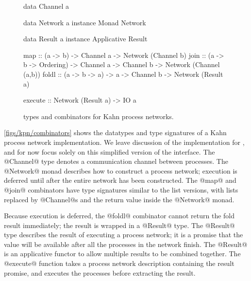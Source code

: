 \begin{figure}
\begin{haskell}
data Channel a

data Network a
instance Monad Network

data Result  a
instance Applicative Result

map     :: (a -> b) -> Channel a
        -> Network (Channel b)
join    :: (a -> b -> Ordering) -> Channel a -> Channel b
        -> Network (Channel (a,b))
foldl   :: (a -> b -> a) -> a -> Channel b
        -> Network (Result a)

execute :: Network (Result a) -> IO a
\end{haskell}
\caption[Types and combinators for Kahn process networks]{types and combinators for Kahn process networks.}
\label{figs/kpn/combinators}
\end{figure}

\autoref{figs/kpn/combinators} shows the datatypes and type signatures of a Kahn process network implementation.
We leave discussion of the implementation for , and for now focus solely on this simplified version of the interface.
The @Channel@ type denotes a communication channel between processes.
The @Network@ monad describes how to construct a process network; execution is deferred until after the entire network has been constructed.
The @map@ and @join@ combinators have type signatures similar to the list versions, with lists replaced by @Channel@s and the return value inside the @Network@ monad.

Because execution is deferred, the @foldl@ combinator cannot return the fold result immediately; the result is wrapped in a @Result@ type.
The @Result@ type describes the result of executing a process network; it is a promise that the value will be available after all the processes in the network finish.
The @Result@ is an applicative functor to allow multiple results to be combined together.
The @execute@ function takes a process network description containing the result promise, and executes the processes before extracting the result.



